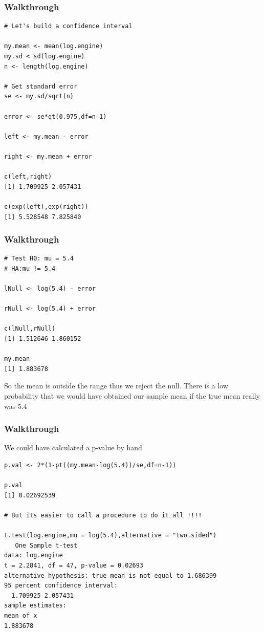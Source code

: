\documentclass{beamer}
\begin{document}

\begin{frame}[fragile]
\frametitle{Walkthrough}
\footnotesize
\begin{verbatim}
# Let's build a confidence interval

my.mean <- mean(log.engine)
my.sd < sd(log.engine)
n <- length(log.engine)

# Get standard error
se <- my.sd/sqrt(n)

error <- se*qt(0.975,df=n-1)

left <- my.mean - error

right <- my.mean + error

c(left,right)
[1] 1.709925 2.057431

c(exp(left),exp(right))
[1] 5.528548 7.825840
\end{verbatim}
\end{frame}


\begin{frame}[fragile]
\frametitle{Walkthrough}
\footnotesize
\begin{verbatim}
# Test H0: mu = 5.4
# HA:mu != 5.4

lNull <- log(5.4) - error

rNull <- log(5.4) + error

c(lNull,rNull)
[1] 1.512646 1.860152

my.mean
[1] 1.883678
\end{verbatim}
\small
So the mean is outside the range thus we reject the null. There is a low probability that we would have obtained our sample mean if the true mean really was 5.4
\end{frame}


\begin{frame}[fragile]
\frametitle{Walkthrough}
\small
We could have calculated a p-value by hand
\begin{verbatim}
p.val <- 2*(1-pt((my.mean-log(5.4))/se,df=n-1))

p.val
[1] 0.02692539

# But its easier to call a procedure to do it all !!!!

t.test(log.engine,mu = log(5.4),alternative = "two.sided")
   One Sample t-test
data: log.engine
t = 2.2841, df = 47, p-value = 0.02693
alternative hypothesis: true mean is not equal to 1.686399
95 percent confidence interval:
  1.709925 2.057431
sample estimates:
mean of x
1.883678
\end{verbatim}
\end{frame}
\end{document}
